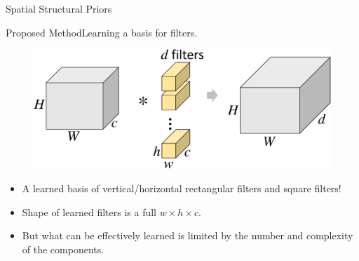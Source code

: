 \documentclass[t,xcolor=dvipsnames]{beamer}
\begin{document}
\begin{frame}
\vfill
\centering
Spatial Structural Priors\par%
\vfill
\end{frame}

\usebackgroundtemplate{}

\begin{frame}{Proposed Method}{Learning a basis for filters.}
\begin{figure}
   \includegraphics[width=\textwidth, page=4]{../Figs/PDF/sparsification}
\end{figure}
\begin{itemize}
    \item A learned basis of vertical/horizontal rectangular filters and square filters!
    \item Shape of learned filters is a full $w \times h \times c$.
    \item But what can be effectively learned is limited by the number and complexity of the components.
\end{itemize}
\end{frame}
\end{document}
